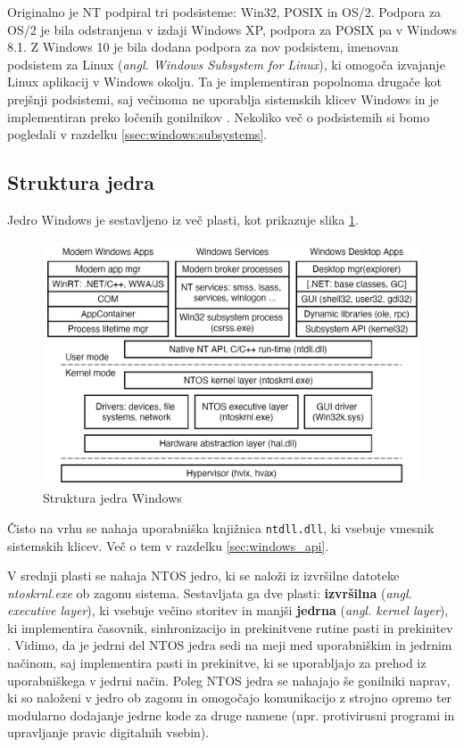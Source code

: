 \documentclass[a4paper,12pt,openright]{book}
\begin{document}
Originalno je NT podpiral tri podsisteme: Win32, POSIX in OS/2.
Podpora za OS/2 je bila odstranjena v izdaji Windows XP, podpora za POSIX pa v Windows 8.1.
Z Windows 10 je bila dodana podpora za nov podsistem, imenovan podsistem za Linux (\textit{angl. Windows Subsystem for Linux}), ki omogoča izvajanje Linux aplikacij v Windows okolju.
Ta je implementiran popolnoma drugače kot prejšnji podsistemi, saj večinoma ne uporablja sistemskih klicev Windows in je implementiran preko ločenih gonilnikov \cite{Yosifovich_Russinovich_Solomon_Ionescu_2017}.
Nekoliko več o podsistemih si bomo pogledali v razdelku \ref{ssec:windows:subsystems}.

\subsection{Struktura jedra}

Jedro Windows je sestavljeno iz več plasti, kot prikazuje slika \ref{fig:windows_kernel_structure}.

\begin{figure}[h!]
	\begin{center}
		\includegraphics[width=\textwidth]{images/windows_programming_layers.png}
	\end{center}
	\caption{Struktura jedra Windows \cite{Tanenbaum_Bos_2023}}
	\label{fig:windows_kernel_structure}
\end{figure}

Čisto na vrhu se nahaja uporabniška knjižnica \texttt{ntdll.dll}, ki vsebuje vmesnik sistemskih klicev.
Več o tem v razdelku \ref{sec:windows_api}.

V srednji plasti se nahaja NTOS jedro, ki se naloži iz izvršilne datoteke \textit{ntoskrnl.exe} ob zagonu sistema.
Sestavljata ga dve plasti: \textbf{izvršilna} (\textit{angl. executive layer}), ki vsebuje večino storitev in manjši \textbf{jedrna} (\textit{angl. kernel layer}), ki implementira časovnik, sinhronizacijo in prekinitvene rutine pasti in prekinitev \cite{Tanenbaum_Bos_2023}.
Vidimo, da je jedrni del NTOS jedra sedi na meji med uporabniškim in jedrnim načinom, saj implementira pasti in prekinitve, ki se uporabljajo za prehod iz uporabniškega v jedrni način.
Poleg NTOS jedra se nahajajo še gonilniki naprav, ki so naloženi v jedro ob zagonu in omogočajo komunikacijo z strojno opremo ter modularno dodajanje jedrne kode za druge namene (npr. protivirusni programi in upravljanje pravic digitalnih vsebin).
\end{document}
